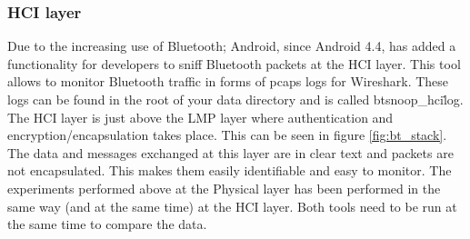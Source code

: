 \subsubsection{HCI layer}
Due to the increasing use of Bluetooth; Android, since Android 4.4, has added a functionality for developers to sniff Bluetooth packets at the HCI layer. This tool allows to monitor Bluetooth traffic in forms of pcaps logs for Wireshark. These logs can be found in the root of your data directory and is called btsnoop\_hci\.log.\pend
The HCI layer is just above the LMP layer where authentication and encryption/encapsulation takes place. This can be seen in figure \ref{fig:bt_stack}. The data and messages exchanged at this layer are in clear text and packets are not encapsulated. This makes them easily identifiable and easy to monitor. \pend
The experiments performed above at the Physical layer has been performed in the same way (and at the same time) at the HCI layer. Both tools need to be run at the same time to compare the data.
	